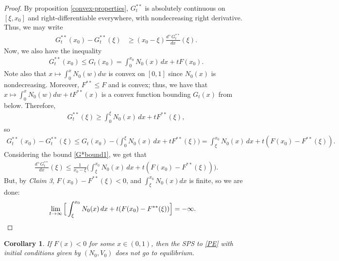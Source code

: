 \documentclass[10pt,a4paper]{amsart}
\newtheorem{cor}[thm]{Corollary}
\numberwithin{equation}{section}
\begin{document}
\begin{proof}
    By proposition \ref{convex-properties}, $G_t^{**}$ is absolutely continuous on $[\xi,x_0]$ and right-differentiable everywhere, with nondecreasing right derivative. Thus, we may write
    \begin{align}%
        G_t^{**}(x_0)-G_t^{**}(\xi)&%
        \label{G*bound1}
        \geq%
        (x_0-\xi)\frac{d^+ G_t^{**}}{dx}(\xi).
    \end{align}
    Now, we also have the inequality  
    \begin{align*}
        G_t^{**}(x_0)\leq G_t(x_0)=\int_0^{x_0} N_0(x) \, dx+tF(x_0).
    \end{align*}
    Note also that $x\mapsto\int_0^x N_0(w)dw$ is convex on $[0,1]$ since $N_0(x)$ is nondecreasing. Moreover, $F^{**}\leq F$ and is convex; thus, we have that $x\mapsto\int_0^x N_0(w)dw+tF^{**}(x)$ is a convex function bounding $G_t(x)$ from below. %
    Therefore, 
    \begin{align*}
        G_t^{**}(\xi)\geq\int_0^\xi N_0(x) \, dx+tF^{**}(\xi),
    \end{align*}
    so 
    \begin{align*}
        G_t^{**}(x_0)-G_t^{**}(\xi)\leq G_t(x_0)-\bigg(\int_0^\xi \!\! N_0(x) \, dx+tF^{**}(\xi)\bigg)=\int_\xi^{x_0} \!\! N_0(x) \, dx+t(F(x_0)-F^{**}(\xi)).
    \end{align*}
    Considering the bound \eqref{G*bound1}, we get that 
    \begin{align*}
        \frac{d^+ G_t^{**}}{dx}(\xi)\leq\frac{1}{x_0-\xi}\Big(\int_\xi^{x_0} N_0(x) \, dx+t(F(x_0)-F^{**}(\xi))\Big).
    \end{align*}
    But, by \textit{Claim 3}, $F(x_0)-F^{**}(\xi)<0$, and $\int_\xi^{x_0} N_0(x)dx$ is finite, so we are done: 
    \begin{align*}
        \lim_{t\to\infty}\Big[\int_\xi^{x_0} N_0(x) \, dx+t(F(x_0)-F^{**}(\xi))\Big]&=-\infty. \qedhere
    \end{align*}
\end{proof}

\begin{cor}\label{necessary-cor}
    If $F(x)<0$ for some $x\in (0,1)$, then the SPS to \eqref{PE} with initial conditions given by $(N_0,V_0)$ does not go to equilibrium.
\end{cor}
\end{document}
